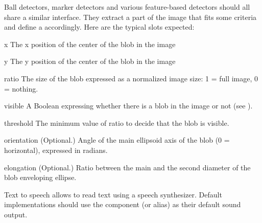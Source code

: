 
Ball detectors, marker detectors and various feature-based detectors
should all share a similar interface. They extract a part of the image
that fits some criteria and define a  accordingly. Here are
the typical slots expected:

\begin{urbiscriptapi}
\item[x] The x position of the center of the blob in the image

\item[y] The y position of the center of the blob in the image

\item[ratio] The size of the blob expressed as a normalized image size: 1 =
  full image, 0 = nothing.

\item[visible] A Boolean expressing whether there is a blob in the image or
  not (see ).

\item[threshold] The minimum value of ratio to decide that the blob is
  visible.

\item[orientation] (Optional.)  Angle of the main ellipsoid axis of the blob (0 =
  horizontal), expressed in radians.

\item[elongation] (Optional.)  Ratio between the main and the second diameter of the
  blob enveloping ellipse.
\end{urbiscriptapi}

Text to speech allows to read text using a speech synthesizer. Default
implementations should use the  component (or alias) as
their default sound output.

